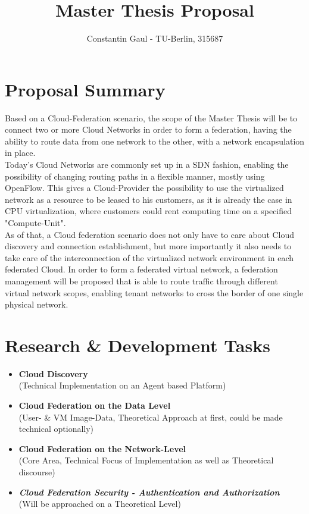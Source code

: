 \documentclass[a4paper,10pt]{article}
\title{Master Thesis Proposal}
\author{Constantin Gaul - TU-Berlin, 315687}
\begin{document}
\maketitle

\section{Proposal Summary}
Based on a Cloud-Federation scenario, the scope of the Master Thesis will be to connect two or more Cloud Networks in order to form a federation, having the ability to route data from one network to the other, with a network encapsulation in place.\\
Today's Cloud Networks are commonly set up in a SDN fashion, enabling the possibility of changing routing paths in a flexible manner, mostly using OpenFlow. This gives a Cloud-Provider the possibility to use the virtualized network as a resource to be leased to his customers, as it is already the case in CPU virtualization, where customers could rent computing time on a specified "Compute-Unit".\\
As of that, a Cloud federation scenario does not only have to care about Cloud discovery and connection establishment, but more importantly it also needs to take care of the interconnection of the virtualized network environment in each federated Cloud. In order to form a federated virtual network, a federation management will be proposed that is able to route traffic through different virtual network scopes, enabling tenant networks to cross the border of one single physical network.

\section{Research \& Development Tasks}
\begin{itemize}
	\item \textbf{Cloud Discovery} \\(Technical Implementation on an Agent based Platform)
	\item \textbf{Cloud Federation on the Data Level} \\(User- \& VM Image-Data, Theoretical Approach at first, could be made technical optionally)
	\item \textbf{Cloud Federation on the Network-Level} \\(Core Area, Technical Focus of Implementation as well as Theoretical discourse)
	\item \textit{\textbf{Cloud Federation Security - Authentication and Authorization}} \\(Will be approached on a Theoretical Level)
\end{itemize}
\end{document}
